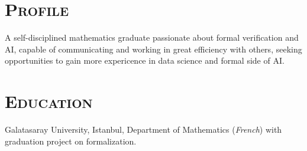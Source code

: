 \documentclass[oneside, 12pt]{memoir}
\begin{document}
\pagestyle{empty}
\section*{\textsc{Profile}}
\noindent
A self-disciplined mathematics graduate passionate about formal
verification and AI, capable of communicating and working in great
efficiency with others, seeking opportunities to gain more expericence in
data science and formal side of AI.
\section*{\textsc{Education}}
\noindent
Galatasaray University, Istanbul, Department of Mathematics
(\textit{French}) with graduation project on formalization.
%
\end{document}

